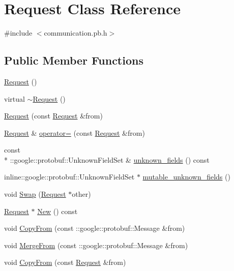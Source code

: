 \hypertarget{classRequest}{\section{Request Class Reference}
\label{classRequest}
}


{\ttfamily \#include $<$communication.\-pb.\-h$>$}

\subsection*{Public Member Functions}
\begin{DoxyCompactItemize}
\item 
\hyperlink{classRequest_afaf8d8928de7ffff8a3767589489bd33}{Request} ()
\item 
virtual \hyperlink{classRequest_a4d57c725686701f773eb3630630a7ea2}{$\sim$\-Request} ()
\item 
\hyperlink{classRequest_ad98d77ec146e4853b747cf8bf0b86c6e}{Request} (const \hyperlink{classRequest}{Request} \&from)
\item 
\hyperlink{classRequest}{Request} \& \hyperlink{classRequest_a573c49a3575fbd7a6975ce725e45a55a}{operator=} (const \hyperlink{classRequest}{Request} \&from)
\item 
const \\*
\-::google\-::protobuf\-::\-Unknown\-Field\-Set \& \hyperlink{classRequest_a29f9a4387b29de1dc122f397edfbe5eb}{unknown\-\_\-fields} () const 
\item 
inline\-::google\-::protobuf\-::\-Unknown\-Field\-Set $\ast$ \hyperlink{classRequest_a5e5516848f5287cd1a7c654e616392c2}{mutable\-\_\-unknown\-\_\-fields} ()
\item 
void \hyperlink{classRequest_acae5dd16016aa389ec900ff6aacd7671}{Swap} (\hyperlink{classRequest}{Request} $\ast$other)
\item 
\hyperlink{classRequest}{Request} $\ast$ \hyperlink{classRequest_a216adf06ce52517ec21b7a3caf88e934}{New} () const 
\item 
void \hyperlink{classRequest_a3a14bd3513b1f241c6c9fe01d4871bf6}{Copy\-From} (const \-::google\-::protobuf\-::\-Message \&from)
\item 
void \hyperlink{classRequest_a6155e33d5c024b400d617f182bcec2e1}{Merge\-From} (const \-::google\-::protobuf\-::\-Message \&from)
\item 
void \hyperlink{classRequest_a62159e349cb42291a90532438ed9dd96}{Copy\-From} (const \hyperlink{classRequest}{Request} \&from)
\item 

\end{DoxyCompactItemize}
